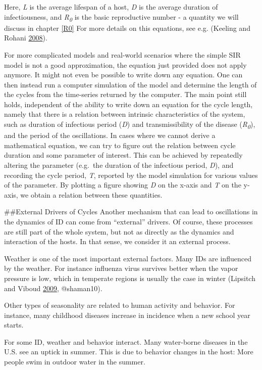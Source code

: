 \documentclass[]{book}
\theoremstyle{definition}
\theoremstyle{definition}
\theoremstyle{definition}
\theoremstyle{remark}
\begin{document}
Here, \emph{L} is the average lifespan of a host, \emph{D} is the
average duration of infectiousness, and \emph{R\textsubscript{0}} is the
basic reproductive number - a quantity we will discuss in chapter
\ref{R0} For more details on this equations, see e.g. (Keeling and
Rohani \protect\hyperlink{ref-keeling08}{2008}).

For more complicated models and real-world scenarios where the simple
SIR model is not a good approximation, the equation just provided does
not apply anymore. It might not even be possible to write down any
equation. One can then instead run a computer simulation of the model
and determine the length of the cycles from the time-series returned by
the computer. The main point still holds, independent of the ability to
write down an equation for the cycle length, namely that there is a
relation between intrinsic characteristics of the system, such as
duration of infectious period (\emph{D}) and transmissibility of the
disease (\emph{R\textsubscript{0}}), and the period of the oscillations.
In cases where we cannot derive a mathematical equation, we can try to
figure out the relation between cycle duration and some parameter of
interest. This can be achieved by repeatedly altering the parameter
(e.g.~the duration of the infectious period, \emph{D}), and recording
the cycle period, \emph{T}, reported by the model simulation for various
values of the parameter. By plotting a figure showing \emph{D} on the
x-axis and \emph{T} on the y-axis, we obtain a relation between these
quantities.

\#\#External Drivers of Cycles Another mechanism that can lead to
oscillations in the dynamics of ID can come from ``external'' drivers.
Of course, these processes are still part of the whole system, but not
as directly as the dynamics and interaction of the hosts. In that sense,
we consider it an external process.

Weather is one of the most important external factors. Many IDs are
influenced by the weather. For instance influenza virus survives better
when the vapor pressure is low, which in temperate regions is usually
the case in winter (Lipsitch and Viboud
\protect\hyperlink{ref-lipsitch09}{2009}, @shaman10).

Other types of seasonality are related to human activity and behavior.
For instance, many childhood diseases increase in incidence when a new
school year starts.

For some ID, weather and behavior interact. Many water-borne diseases in
the U.S. see an uptick in summer. This is due to behavior changes in the
host: More people swim in outdoor water in the summer.
\end{document}
